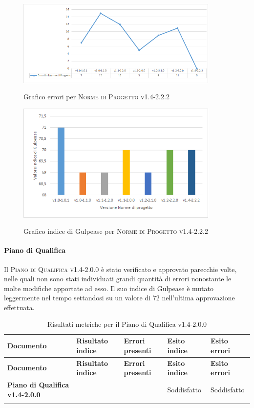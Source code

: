 \documentclass[../piano-di-qualifica.tex]{subfiles}
\begin{document}
\begin{figure}[H]
  \centering
  \includegraphics[width=10cm]{img/erroriNdPv1.4-2.2.2.png}
  \label{fig:errori_ndp}
  \caption{Grafico errori per \textsc{Norme di Progetto v1.4-2.2.2}}
\end{figure}

\begin{figure}[H]
  \centering
  \includegraphics[width=10cm]{img/gulpeaseNdPv1.4-2.2.2.png}
  \label{fig:gulpease_ndp}
  \caption{Grafico indice di Gulpease per \textsc{Norme di Progetto v1.4-2.2.2}}
\end{figure}


\paragraph{Piano di Qualifica}
\label{sub:piano_di_qualifica}
Il \textsc{Piano di Qualifica v1.4-2.0.0} è stato verificato e approvato parecchie volte, nelle quali non sono stati individuati grandi quantità di errori nonostante le molte modifiche apportate ad esso.
Il suo indice di Gulpease è mutato leggermente nel tempo settandosi su un valore di 72 nell'ultima approvazione effettuata.

\renewcommand{\arraystretch}{2} %
\begin{longtable}[H]{>{\centering\bfseries}m{6cm} >{\centering}m{2cm} >{\centering}m{2.5cm} >{\centering}m{2.5cm} >{\centering\arraybackslash}m{2.5cm}}  
  \rowcolor{lightgray}
  {\textbf{Documento}} & {\textbf{Risultato indice}} & {\textbf{Errori presenti}} & {\textbf{Esito indice}} & {\textbf{Esito errori}}  \\
  \endfirsthead%
  \rowcolor{lightgray}
  {\textbf{Documento}} & {\textbf{Risultato indice}} & {\textbf{Errori presenti}} & {\textbf{Esito indice}} & {\textbf{Esito errori}}  \\
  \endhead%
  \textbf{Piano di Qualifica v1.4-2.0.0} & 72                & 0               & Soddisfatto & Soddisfatto \\
  \caption{Risultati metriche per il Piano di Qualifica v1.4-2.0.0}
  \label{tab:my-table}
\end{longtable}
\end{document}
